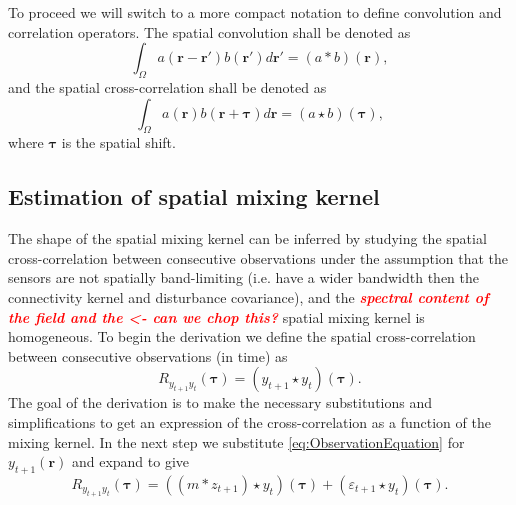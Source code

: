 \documentclass[10pt,twocolumn,twoside]{IEEEtran}
\newcommand{\dean}[1]{\textsf{\emph{\textbf{\textcolor{red}{#1}}}}}
\begin{document}
To proceed we will switch to a more compact notation to define convolution and correlation operators. The spatial convolution shall be denoted as
\begin{equation}
	\int_\Omega a(\mathbf{r}-\mathbf{r}')b(\mathbf{r}')d\mathbf{r}' = (a\ast b)(\mathbf{r}),
\end{equation}
and the spatial cross-correlation shall be denoted as 
\begin{equation}
	\int_\Omega a(\mathbf{r})b(\mathbf{r}+\boldsymbol{\tau})d\mathbf{r} = (a\star b)(\boldsymbol{\tau}),
\end{equation} 
where $\boldsymbol{\tau}$ is the spatial shift.

\subsection{Estimation of spatial mixing kernel} 
The shape of the spatial mixing kernel can be inferred by studying the spatial cross-correlation between consecutive observations under the assumption that the sensors are not spatially band-limiting (i.e. have a wider bandwidth then the connectivity kernel and disturbance covariance), and the \dean{spectral content of the field and the <- can we chop this?} spatial mixing kernel is homogeneous.  To begin the derivation we define the spatial cross-correlation between consecutive observations (in time) as  
\begin{equation}
	R_{y_{t+1}y_t}(\boldsymbol{\tau}) = \left(y_{t+1}\star y_t\right)\left(\boldsymbol{\tau}\right).
\end{equation}
The goal of the derivation is to make the necessary substitutions and simplifications to get an expression of the cross-correlation as a function of the mixing kernel. In the next step we substitute \eqref{eq:ObservationEquation} for $y_{t+1}(\mathbf{r})$ and expand to give
\begin{equation}
	R_{y_{t+1}y_t}\left(\boldsymbol{\tau}\right) = \left(\left(m \ast z_{t+1}\right)\star y_t\right)\left(\boldsymbol{\tau}\right) + \left(\varepsilon_{t+1} \star y_t\right)\left(\boldsymbol{\tau}\right).
\end{equation}
\end{document}
